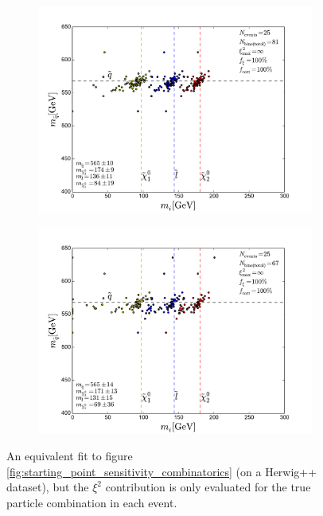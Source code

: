 \documentclass[twoside,english]{uiofysmaster}
\begin{document}
\begin{figure}[hbt]
	\begin{subfigure}[b]{0.45\textwidth}
		\includegraphics[width=\textwidth]{figures/improving_combinatorics/herwigpp-momcons_nocomb_800-500-300-50.pdf} 
		\caption{ }
	\end{subfigure}
	\begin{subfigure}[b]{0.45\textwidth}
		\includegraphics[width=\textwidth]{figures/improving_combinatorics/herwigpp-momcons_nocomb_1000-100-80-30.pdf}
		\caption{ } 
	\end{subfigure}
	\caption{An equivalent fit to figure \ref{fig:starting_point_sensitivity_combinatorics} (on a {\ttfamily Herwig++} dataset), but the $\xi^2$ contribution is only evaluated for the true particle combination in each event.}
	\label{fig:starting_point_sensitivity_no_combinatorics}
\end{figure}
\end{document}

